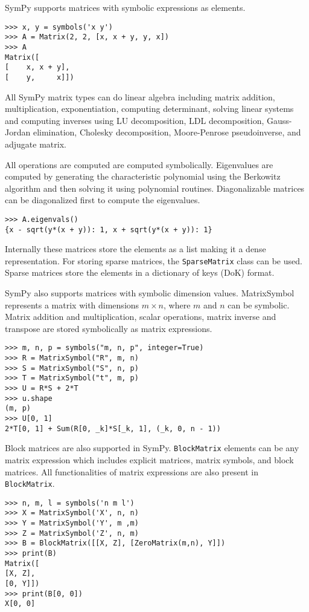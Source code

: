 SymPy supports matrices with symbolic expressions as elements.

\begin{verbatim}
>>> x, y = symbols('x y')
>>> A = Matrix(2, 2, [x, x + y, y, x])
>>> A
Matrix([
[    x, x + y],
[    y,     x]])
\end{verbatim}

All SymPy matrix types can do linear algebra including matrix addition,
multiplication, exponentiation, computing determinant, solving linear systems
and computing inverses using LU decomposition, LDL decomposition, Gauss-Jordan
elimination, Cholesky decomposition, Moore-Penrose pseudoinverse, and adjugate
matrix.

All operations are computed are computed symbolically. Eigenvalues are
computed by generating the characteristic polynomial using the Berkowitz
algorithm and then solving it using polynomial routines. Diagonalizable
matrices can be diagonalized first to compute the eigenvalues.

\begin{verbatim}
>>> A.eigenvals()
{x - sqrt(y*(x + y)): 1, x + sqrt(y*(x + y)): 1}
\end{verbatim}

Internally these matrices store the elements as a list making it a dense
representation. For storing sparse matrices, the \verb|SparseMatrix| class can
be used. Sparse matrices store the elements in a dictionary of keys (DoK)
format.

SymPy also supports matrices with symbolic dimension values. MatrixSymbol
represents a matrix with dimensions $m\times n$, where $m$ and $n$ can be
symbolic. Matrix addition and multiplication, scalar operations, matrix
inverse and transpose are stored symbolically as matrix expressions.

\begin{verbatim}
>>> m, n, p = symbols("m, n, p", integer=True)
>>> R = MatrixSymbol("R", m, n)
>>> S = MatrixSymbol("S", n, p)
>>> T = MatrixSymbol("t", m, p)
>>> U = R*S + 2*T
>>> u.shape
(m, p)
>>> U[0, 1]
2*T[0, 1] + Sum(R[0, _k]*S[_k, 1], (_k, 0, n - 1))
\end{verbatim}

Block matrices are also supported in SymPy. \verb|BlockMatrix| elements can be any
matrix expression which includes explicit matrices, matrix symbols, and block
matrices. All functionalities of matrix expressions are also present in
\verb|BlockMatrix|.


\begin{verbatim}
>>> n, m, l = symbols('n m l')
>>> X = MatrixSymbol('X', n, n)
>>> Y = MatrixSymbol('Y', m ,m)
>>> Z = MatrixSymbol('Z', n, m)
>>> B = BlockMatrix([[X, Z], [ZeroMatrix(m,n), Y]])
>>> print(B)
Matrix([
[X, Z],
[0, Y]])
>>> print(B[0, 0])
X[0, 0]
\end{verbatim}
